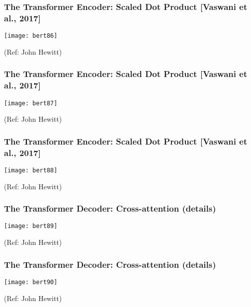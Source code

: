 \begin{frame}[fragile]\frametitle{The Transformer Encoder: Scaled Dot Product [Vaswani et al., 2017]}

			
			\begin{center}
			\texttt{[image: bert86]}
			\end{center}		
			
		
			{\tiny (Ref: John Hewitt)}

\end{frame}

\begin{frame}[fragile]\frametitle{The Transformer Encoder: Scaled Dot Product [Vaswani et al., 2017]}

			
			\begin{center}
			\texttt{[image: bert87]}
			\end{center}		
			
		
			{\tiny (Ref: John Hewitt)}

\end{frame}

\begin{frame}[fragile]\frametitle{The Transformer Encoder: Scaled Dot Product [Vaswani et al., 2017]}

			
			\begin{center}
			\texttt{[image: bert88]}
			\end{center}		
			
		
			{\tiny (Ref: John Hewitt)}

\end{frame}

\begin{frame}[fragile]\frametitle{The Transformer Decoder: Cross-attention (details)}

			
			\begin{center}
			\texttt{[image: bert89]}
			\end{center}		
			
		
			{\tiny (Ref: John Hewitt)}

\end{frame}

\begin{frame}[fragile]\frametitle{The Transformer Decoder: Cross-attention (details)}

			
			\begin{center}
			\texttt{[image: bert90]}
			\end{center}		
			
			{\tiny (Ref: John Hewitt)}

\end{frame}

